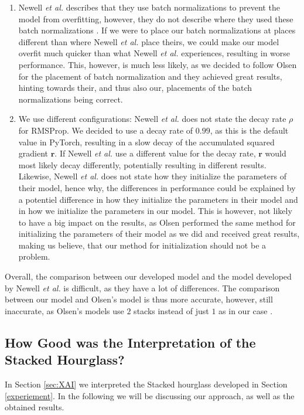\documentclass[./main.tex]{subfiles}
\begin{document}
\begin{enumerate}
    \item Newell \textit{et al.} describes that they use batch normalizations to prevent the model from overfitting, however, they do not describe where they used these batch normalizations \cite{Newell}. If we were to place our batch normalizations at places different than where Newell \textit{et al.} \cite{Newell} place theirs, we could make our model overfit much quicker than what Newell \textit{et al.} \cite{Newell} experiences, resulting in worse performance. This, however, is much less likely, as we decided to follow Olsen \cite{Camilla} for the placement of batch normalization and they achieved great results, hinting towards their, and thus also our, placements of the batch normalizations being correct.
    \item We use different configurations: Newell \textit{et al.} \cite{Newell} does not state the decay rate $\rho$ for RMSProp. We decided to use a decay rate of $0.99$, as this is the default value in PyTorch, resulting in a slow decay of the accumulated squared gradient $\bm{r}$. If Newell \textit{et al.} \cite{Newell} use a different value for the decay rate, $\bm{r}$ would most likely decay differently, potentially resulting in different results. Likewise, Newell \textit{et al.} \cite{Newell} does not state how they initialize the parameters of their model, hence why, the differences in performance could be explained by a potentiel difference in how they initialize the parameters in their model and in how we initialize the parameters in our model. This is however, not likely to have a big impact on the results, as Olsen \cite{Camilla} performed the same method for initializing the parameters of their model as we did and received great results, making us believe, that our method for initialization should not be a problem.
\end{enumerate}
Overall, the comparison between our developed model and the model developed by Newell \textit{et al.} \cite{Newell} is difficult, as they have a lot of differences. The comparison between our model and Olsen's model \cite{Camilla} is thus more accurate, however, still inaccurate, as Olsen's models use $2$ stacks instead of just $1$ as in our case \cite{Camilla}.

\subsection{How Good was the Interpretation of the Stacked Hourglass?}\label{subsec:XAI_disc}
In Section \ref{sec:XAI} we interpreted the Stacked hourglass developed in Section \ref{experiement}. In the following we will be discussing our approach, as well as the obtained results.
\end{document}
